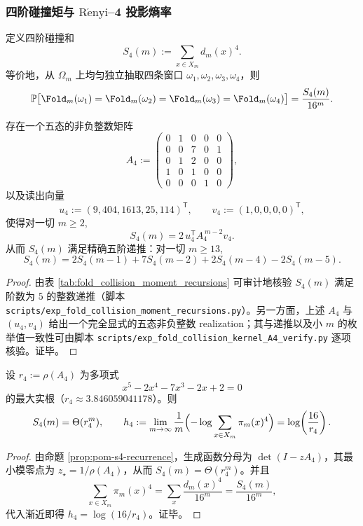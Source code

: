 \subsubsection{四阶碰撞矩与 \texorpdfstring{$\mathrm{R\acute{e}nyi}$}{Renyi}--4 投影熵率}\label{subsec:pom-s4}
\begin{definition}[四阶折叠碰撞矩]\label{def:pom-s4}
定义四阶碰撞和
$$
S_4(m):=\sum_{x\in X_m} d_m(x)^4.
$$
等价地，从 \(\Omega_m\) 上均匀独立抽取四条窗口 \(\omega_1,\omega_2,\omega_3,\omega_4\)，则
$$
\mathbb{P}\bigl[\Fold_m(\omega_1)=\Fold_m(\omega_2)=\Fold_m(\omega_3)=\Fold_m(\omega_4)\bigr]=\frac{S_4(m)}{16^m}.
$$
\end{definition}

\begin{proposition}\label{prop:pom-s4-recurrence}
存在一个五态的非负整数矩阵
$$
A_4:=
\begin{pmatrix}
0&1&0&0&0\\
0&0&7&0&1\\
0&1&2&0&0\\
1&0&1&0&0\\
0&0&0&1&0
\end{pmatrix},
$$
以及读出向量
$$
u_4:=(9,404,1613,25,114)^{\mathsf T},\qquad
v_4:=(1,0,0,0,0)^{\mathsf T},
$$
使得对一切 \(m\ge 2\),
$$
S_4(m)=2\,u_4^{\mathsf T}A_4^{\,m-2}v_4.
$$
从而 \(S_4(m)\) 满足精确五阶递推：对一切 \(m\ge 13\),
$$
S_4(m)=2S_4(m-1)+7S_4(m-2)+2S_4(m-4)-2S_4(m-5).
$$
\end{proposition}
\begin{proof}
由表 \ref{tab:fold_collision_moment_recursions} 可审计地核验 \(S_4(m)\) 满足阶数为 \(5\) 的整数递推（脚本 \texttt{scripts/exp\_fold\_collision\_moment\_recursions.py}）。另一方面，上述 \(A_4\) 与 \((u_4,v_4)\) 给出一个完全显式的五态非负整数 realization；其与递推以及小 \(m\) 的枚举值一致性可由脚本 \texttt{scripts/exp\_fold\_collision\_kernel\_A4\_verify.py} 逐项核验。证毕。
\end{proof}

\begin{corollary}\label{cor:pom-s4-asymptotic}
设 \(r_4:=\rho(A_4)\) 为多项式
$$
x^5-2x^4-7x^3-2x+2=0
$$
的最大实根（\(r_4\approx 3.846059041178\)）。则
$$
S_4(m)=\Theta(r_4^m),
\qquad
h_4:=\lim_{m\to\infty}\frac{1}{m}\Bigl(-\log\sum_{x\in X_m}\pi_m(x)^4\Bigr)
=\log\!\left(\frac{16}{r_4}\right).
$$
\end{corollary}
\begin{proof}
由命题 \ref{prop:pom-s4-recurrence}，生成函数分母为 \(\det(I-zA_4)\)，其最小模零点为 \(z_\star=1/\rho(A_4)\)，从而 \(S_4(m)=\Theta(r_4^m)\)。并且
$$
\sum_{x\in X_m}\pi_m(x)^4=\sum_x\frac{d_m(x)^4}{16^m}=\frac{S_4(m)}{16^m},
$$
代入渐近即得 \(h_4=\log(16/r_4)\)。证毕。
\end{proof}


